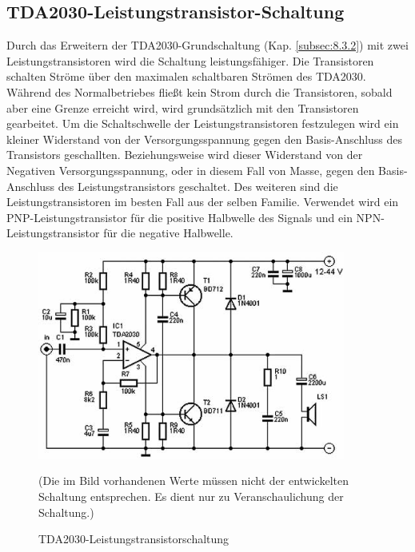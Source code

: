 \subsection{TDA2030-Leistungstransistor-Schaltung}\label{subsec:8.3.3}
Durch das Erweitern der TDA2030-Grundschaltung (Kap. \ref{subsec:8.3.2}) mit zwei Leistungstransistoren wird die Schaltung leistungsfähiger.
Die Transistoren schalten Ströme über den maximalen schaltbaren Strömen des TDA2030. Während des Normalbetriebes fließt kein Strom durch die Transistoren, sobald aber eine Grenze erreicht wird, wird grundsätzlich mit den Transistoren gearbeitet.
Um die Schaltschwelle der Leistungstransistoren festzulegen wird ein kleiner Widerstand von der Versorgungsspannung gegen den Basis-Anschluss des Transistors geschallten.
Beziehungsweise wird dieser Widerstand von der Negativen Versorgungsspannung, oder in diesem Fall von Masse, gegen den Basis-Anschluss des Leistungstransistors geschaltet.
Des weiteren sind die Leistungstransistoren im besten Fall aus der selben Familie.
Verwendet wird ein PNP-Leistungstransistor für die positive Halbwelle des Signals und ein NPN-Leistungstransistor für die negative Halbwelle.
\begin{figure} [H]
	\centering
	\includegraphics[width=0.9\textwidth]{img/Grundlagen/TDA2030/TDA2030-Leistungstransschaltung.jpg}
	\caption[TDA2030-Leistungstransistorschaltung]{TDA2030-Leistungstransistorschaltung\footnotemark}
	\text (Die im Bild vorhandenen Werte müssen nicht der entwickelten Schaltung entsprechen. Es dient nur zu Veranschaulichung der Schaltung.)
	\label {fig:8.3.3.1}
\end{figure}

